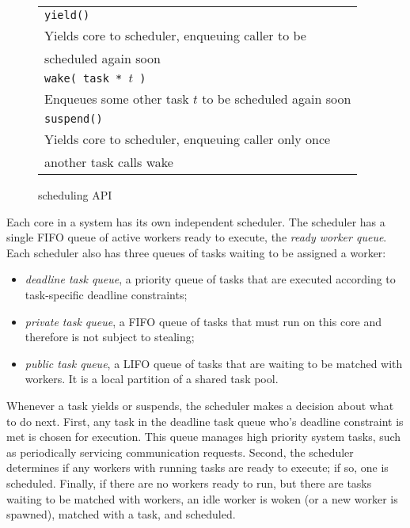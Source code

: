 \begin{figure}[htbp]
  \begin{center}
	\begin{tabular}{l}
    \texttt{\scriptsize yield() } \\
      Yields core to scheduler, enqueuing caller to be \\ scheduled again soon \\
    \texttt{\scriptsize wake( task * $t$ ) } \\
      Enqueues some other task $t$ to be scheduled again soon \\
    \texttt{\scriptsize suspend() }  \\
      Yields core to scheduler, enqueuing caller only once \\ another task calls wake \\
	\end{tabular}
    \begin{minipage}{0.95\columnwidth}
      \caption{\label{fig:scheduling} \Grappa scheduling API } 
    \end{minipage}
  \end{center}
\end{figure}

Each core in a \Grappa system has its own independent scheduler. The scheduler
has a single FIFO queue of active workers ready to execute, the {\it
ready worker queue}. Each scheduler also has three queues of tasks
waiting to be assigned a worker:

\begin{itemize}

\item {\it deadline task queue}, a priority queue of tasks that are executed according to task-specific deadline constraints;

\item {\it private task queue}, a FIFO queue of tasks that must run on
this core and therefore is not subject to stealing;

\item {\it public task queue},  a LIFO queue of tasks that are
  waiting to be matched with workers. It is a local partition of a shared
  task pool.

\end{itemize}


Whenever a task yields or suspends, the scheduler makes a decision about what
to do next. First, any task in the deadline task queue who's deadline
constraint is met is chosen for execution. This queue manages high priority
system tasks, such as periodically servicing communication requests. Second,
the scheduler determines if any workers with running tasks are ready to
execute; if so, one is scheduled. Finally, if there are no workers ready to
run, but there are tasks waiting to be matched with workers, an idle worker is
woken (or a new worker is spawned), matched with a task, and scheduled.

